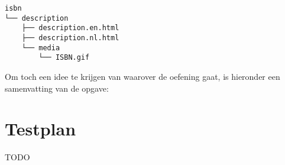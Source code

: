 \begin{verbatim}
isbn
└── description
    ├── description.en.html
    ├── description.nl.html
    └── media
        └── ISBN.gif
\end{verbatim}

Om toch een idee te krijgen van waarover de oefening gaat, is hieronder een samenvatting van de opgave:

\begin{quote}
\end{quote}


\section{Testplan}\label{sec:isbn-testplan}

TODO
